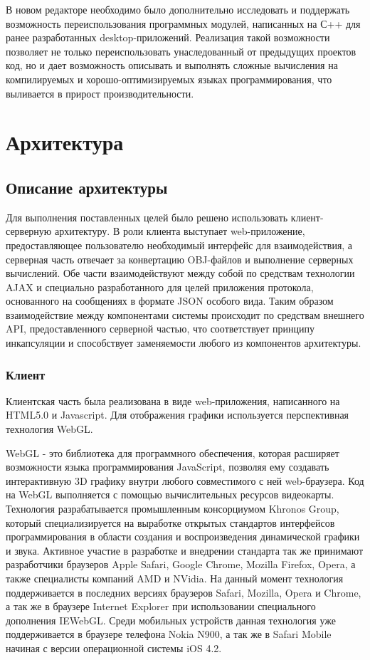 \documentclass[14pt, a4paper]{extarticle}
\let\stdsection\section
\renewcommand\section{\newpage\stdsection}
\begin{document}
В новом редакторе необходимо было дополнительно исследовать и поддержать
возможность переиспользования программных модулей, написанных на С++ для ранее
разработанных desktop-приложений.  Реализация такой возможности позволяет не
только переиспользовать унаследованный от предыдущих проектов код, но и дает
возможность описывать и выполнять сложные вычисления на компилируемых и
хорошо-оптимизируемых языках программирования, что выливается в прирост
производительности.

\section{Архитектура}

\subsection{Описание архитектуры}

Для выполнения поставленных целей было решено использовать клиент-серверную
архитектуру. В роли клиента выступает web-приложение, предоставляющее
пользователю необходимый интерфейс для взаимодействия, а серверная часть
отвечает за конвертацию OBJ-файлов и выполнение серверных вычислений. Обе части
взаимодействуют между собой по средствам технологии AJAX и специально
разработанного для целей приложения протокола, основанного на сообщениях в
формате JSON особого вида. Таким образом взаимодействие между компонентами системы
происходит по средствам внешнего API, предоставленного серверной частью,
что соответствует принципу инкапсуляции и способствует заменяемости
любого из компонентов архитектуры.

\subsubsection{Клиент}

Клиентская часть была реализована в виде web-приложения, написанного
на HTML5.0 и Javascript. Для отображения графики используется
перспективная технология WebGL.

WebGL\cite{webgl} - это библиотека для программного обеспечения, которая расширяет
возможности языка программирования JavaScript, позволяя ему создавать
интерактивную 3D графику внутри любого совместимого с ней web-браузера. Код на
WebGL выполняется с помощью вычислительных ресурсов видеокарты. Технология
разрабатывается промышленным консорциумом Khronos Group, который
специализируется на выработке открытых стандартов интерфейсов программирования в
области создания и воспроизведения динамической графики и звука. Активное
участие в разработке и внедрении стандарта так же принимают разработчики
браузеров Apple Safari, Google Chrome, Mozilla Firefox, Opera,  а также
специалисты компаний AMD и NVidia. На данный момент технология поддерживается в
последних версиях браузеров Safari, Mozilla, Opera и Chrome, а так же в браузере
Internet Explorer при использовании специального дополнения IEWebGL. Среди
мобильных устройств данная технология уже поддерживается в браузере телефона
Nokia N900, а так же в Safari Mobile начиная с версии операционной системы iOS
4.2.
\end{document}
